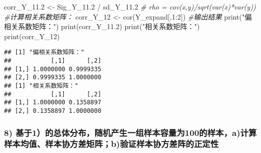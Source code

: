 \documentclass[
]{article}
\newenvironment{Shaded}{\begin{snugshade}}{\end{snugshade}}
\newcommand{\CommentTok}[1]{\textcolor[rgb]{0.56,0.35,0.01}{\textit{#1}}}
\newcommand{\DecValTok}[1]{\textcolor[rgb]{0.00,0.00,0.81}{#1}}
\newcommand{\FloatTok}[1]{\textcolor[rgb]{0.00,0.00,0.81}{#1}}
\newcommand{\FunctionTok}[1]{\textcolor[rgb]{0.00,0.00,0.00}{#1}}
\newcommand{\NormalTok}[1]{#1}
\newcommand{\OtherTok}[1]{\textcolor[rgb]{0.56,0.35,0.01}{#1}}
\newcommand{\SpecialCharTok}[1]{\textcolor[rgb]{0.00,0.00,0.00}{#1}}
\newcommand{\StringTok}[1]{\textcolor[rgb]{0.31,0.60,0.02}{#1}}
\begin{document}
\begin{Shaded}
\begin{Highlighting}[]
\NormalTok{corr\_Y\_11}\FloatTok{.2} \OtherTok{\textless{}{-}}\NormalTok{ Sig\_Y\_11}\FloatTok{.2} \SpecialCharTok{/}\NormalTok{ sd\_Y\_11}\FloatTok{.2} \CommentTok{\# rho = cov(x,y)/sqrt(var(x)*var(y))}
\CommentTok{\#计算相关系数矩阵：}
\NormalTok{corr\_Y\_12 }\OtherTok{\textless{}{-}} \FunctionTok{cor}\NormalTok{(Y\_expand[,}\DecValTok{1}\SpecialCharTok{:}\DecValTok{2}\NormalTok{])}
\CommentTok{\#输出结果}
\FunctionTok{print}\NormalTok{(}\StringTok{"偏相关系数矩阵："}\NormalTok{)}
\FunctionTok{print}\NormalTok{(corr\_Y\_11}\FloatTok{.2}\NormalTok{)}
\FunctionTok{print}\NormalTok{(}\StringTok{"相关系数矩阵："}\NormalTok{)}
\FunctionTok{print}\NormalTok{(corr\_Y\_12)}
\end{Highlighting}
\end{Shaded}

\begin{verbatim}
## [1] "偏相关系数矩阵："
##           [,1]      [,2]
## [1,] 1.0000000 0.9999335
## [2,] 0.9999335 1.0000000
## [1] "相关系数矩阵："
##           [,1]      [,2]
## [1,] 1.0000000 0.1358897
## [2,] 0.1358897 1.0000000
\end{verbatim}

\hypertarget{ux57faux4e8e1ux7684ux603bux4f53ux5206ux5e03ux968fux673aux4ea7ux751fux4e00ux7ec4ux6837ux672cux5bb9ux91cfux4e3a100ux7684ux6837ux672caux8ba1ux7b97ux6837ux672cux5747ux503cux6837ux672cux534fux65b9ux5deeux77e9ux9635bux9a8cux8bc1ux6837ux672cux534fux65b9ux5deeux9635ux7684ux6b63ux5b9aux6027}{%
\subsubsection{\texorpdfstring{\textbf{8)
基于1）的总体分布，随机产生一组样本容量为100的样本，a)计算样本均值、样本协方差矩阵；b)验证样本协方差阵的正定性}}{8) 基于1）的总体分布，随机产生一组样本容量为100的样本，a)计算样本均值、样本协方差矩阵；b)验证样本协方差阵的正定性}}\label{ux57faux4e8e1ux7684ux603bux4f53ux5206ux5e03ux968fux673aux4ea7ux751fux4e00ux7ec4ux6837ux672cux5bb9ux91cfux4e3a100ux7684ux6837ux672caux8ba1ux7b97ux6837ux672cux5747ux503cux6837ux672cux534fux65b9ux5deeux77e9ux9635bux9a8cux8bc1ux6837ux672cux534fux65b9ux5deeux9635ux7684ux6b63ux5b9aux6027}}
\end{document}
